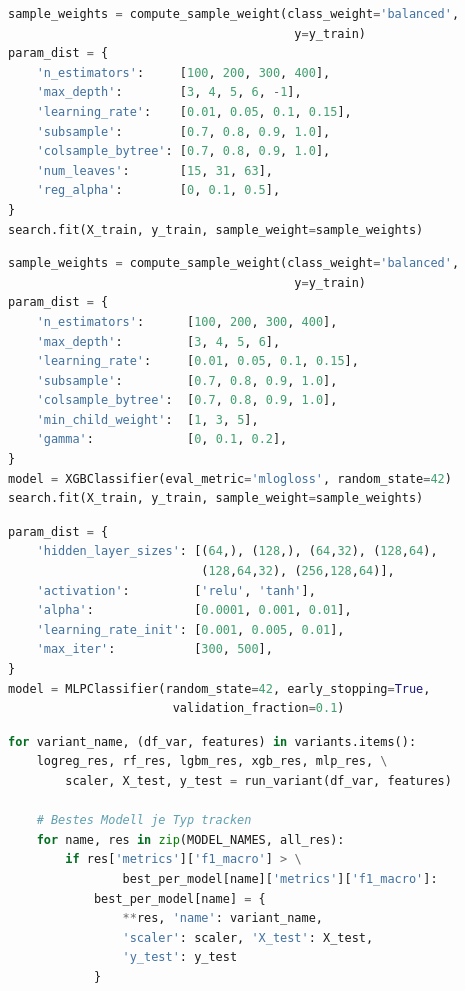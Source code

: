 \begin{lstlisting}[language=Python, caption={Hyperparameter-Suchraum: LightGBM mit Sample Weights},
                   label={lst:lgbm-tuning}]
sample_weights = compute_sample_weight(class_weight='balanced',
                                        y=y_train)
param_dist = {
    'n_estimators':     [100, 200, 300, 400],
    'max_depth':        [3, 4, 5, 6, -1],
    'learning_rate':    [0.01, 0.05, 0.1, 0.15],
    'subsample':        [0.7, 0.8, 0.9, 1.0],
    'colsample_bytree': [0.7, 0.8, 0.9, 1.0],
    'num_leaves':       [15, 31, 63],
    'reg_alpha':        [0, 0.1, 0.5],
}
search.fit(X_train, y_train, sample_weight=sample_weights)
\end{lstlisting}

\begin{lstlisting}[language=Python, caption={Hyperparameter-Suchraum: XGBoost mit Sample Weights},
                   label={lst:xgb-tuning}]
sample_weights = compute_sample_weight(class_weight='balanced',
                                        y=y_train)
param_dist = {
    'n_estimators':      [100, 200, 300, 400],
    'max_depth':         [3, 4, 5, 6],
    'learning_rate':     [0.01, 0.05, 0.1, 0.15],
    'subsample':         [0.7, 0.8, 0.9, 1.0],
    'colsample_bytree':  [0.7, 0.8, 0.9, 1.0],
    'min_child_weight':  [1, 3, 5],
    'gamma':             [0, 0.1, 0.2],
}
model = XGBClassifier(eval_metric='mlogloss', random_state=42)
search.fit(X_train, y_train, sample_weight=sample_weights)
\end{lstlisting}

\begin{lstlisting}[language=Python, caption={MLP-Konfiguration mit Early Stopping},
                   label={lst:mlp-config}]
param_dist = {
    'hidden_layer_sizes': [(64,), (128,), (64,32), (128,64),
                           (128,64,32), (256,128,64)],
    'activation':         ['relu', 'tanh'],
    'alpha':              [0.0001, 0.001, 0.01],
    'learning_rate_init': [0.001, 0.005, 0.01],
    'max_iter':           [300, 500],
}
model = MLPClassifier(random_state=42, early_stopping=True,
                       validation_fraction=0.1)
\end{lstlisting}

\begin{lstlisting}[language=Python, caption={Äußere Trainingsschleife mit Modellselektion},
                   label={lst:training-loop}]
for variant_name, (df_var, features) in variants.items():
    logreg_res, rf_res, lgbm_res, xgb_res, mlp_res, \
        scaler, X_test, y_test = run_variant(df_var, features)

    # Bestes Modell je Typ tracken
    for name, res in zip(MODEL_NAMES, all_res):
        if res['metrics']['f1_macro'] > \
                best_per_model[name]['metrics']['f1_macro']:
            best_per_model[name] = {
                **res, 'name': variant_name,
                'scaler': scaler, 'X_test': X_test,
                'y_test': y_test
            }
\end{lstlisting}

